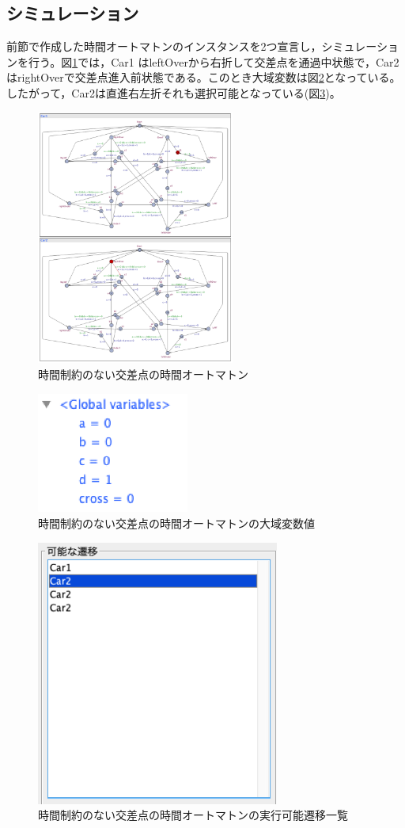 \documentclass[twocolumn,10pt]{jsarticle}
\begin{document}
	\subsection{シミュレーション}
	前節で作成した時間オートマトンのインスタンスを2つ宣言し，シミュレーションを行う。図\ref{IBSi}では，Car1 はleftOverから右折して交差点を通過中状態で，Car2はrightOverで交差点進入前状態である。このとき大域変数は図\ref{IBSGS}となっている。したがって，Car2は直進右左折それも選択可能となっている(図\ref{IBST})。
	\begin{figure}[htbp]
	\centering
	\includegraphics[width=65mm]{IBSimu.png}
	\caption{時間制約のない交差点の時間オートマトン}
	\label{IBSi}
	\end{figure}
	\begin{figure}[htbp]
	\centering
	\includegraphics[width=50mm]{IBSimuGS.png}
	\caption{時間制約のない交差点の時間オートマトンの大域変数値}
	\label{IBSGS}
	\end{figure}
	\begin{figure}[htbp]
	\centering
	\includegraphics[width=80mm]{IBSimuTra.png}
	\caption{時間制約のない交差点の時間オートマトンの実行可能遷移一覧}
	\label{IBST}
	\end{figure}
\end{document}
